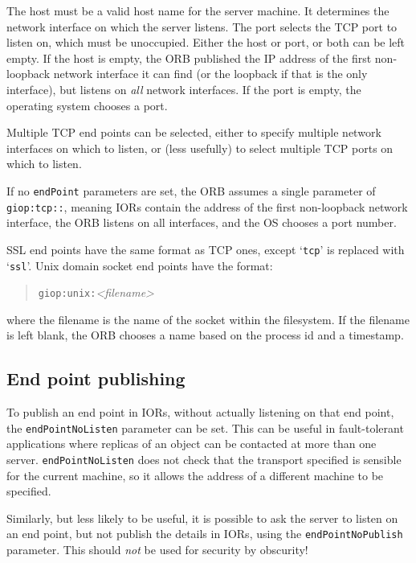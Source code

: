 \documentclass[draft,11pt,twoside,a4paper]{book}
\newcommand{\code}[1]{\texttt{#1}}
\begin{document}
\noindent The host must be a valid host name for the server machine.
It determines the network interface on which the server listens. The
port selects the TCP port to listen on, which must be unoccupied.
Either the host or port, or both can be left empty. If the host is
empty, the ORB published the IP address of the first non-loopback
network interface it can find (or the loopback if that is the only
interface), but listens on \emph{all} network interfaces. If the port
is empty, the operating system chooses a port.

Multiple TCP end points can be selected, either to specify multiple
network interfaces on which to listen, or (less usefully) to select
multiple TCP ports on which to listen.

If no \code{endPoint} parameters are set, the ORB assumes a single
parameter of \code{giop:tcp::}, meaning IORs contain the address of
the first non-loopback network interface, the ORB listens on all
interfaces, and the OS chooses a port number.

SSL end points have the same format as TCP ones, except `\code{tcp}'
is replaced with `\code{ssl}'. Unix domain socket end points have the
format:

\begin{quote}
\code{giop:unix:}\textit{<filename>}
\end{quote}

\noindent where the filename is the name of the socket within the
filesystem. If the filename is left blank, the ORB chooses a name
based on the process id and a timestamp.


\subsection{End point publishing}

To publish an end point in IORs, without actually listening on that
end point, the \code{endPointNoListen} parameter can be set. This can
be useful in fault-tolerant applications where replicas of an object
can be contacted at more than one server. \code{endPointNoListen} does
not check that the transport specified is sensible for the current
machine, so it allows the address of a different machine to be
specified.

Similarly, but less likely to be useful, it is possible to ask the
server to listen on an end point, but not publish the details in IORs,
using the \code{endPointNoPublish} parameter. This should \emph{not}
be used for security by obscurity!
\end{document}
